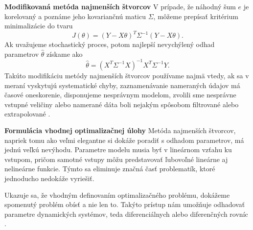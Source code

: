 \textbf{Modifikovaná metóda najmenších štvorcov}
\newline
V prípade, že náhodný šum $ e $ je korelovaný a poznáme jeho kovariančnú maticu $ \Sigma $, môžeme prepísať kritérium minimalizácie do tvaru 
\begin{equation}
	J\left(\theta\right) = \left(Y - X\theta \right)^T \Sigma^{-1} \left(Y - X\theta \right).
\end{equation}
Ak uvažujeme stochastický proces, potom najlepší nevychýlený odhad parametrov $ \hat{\theta} $ získame ako
\begin{equation}
	\hat{\theta} = \left(X^T \Sigma^{-1} X\right)^{-1}X^T \Sigma^{-1} Y.
\end{equation}
Takúto modifikáciu metódy najmenších štvorcov používame najmä vtedy, ak sa v meraní vyskytujú systematické chyby, zaznamenávanie nameraných údajov má časové oneskorenie, disponujeme nesprávnym modelom, zvolili sme nesprávne vstupné veličiny alebo namerané dáta boli nejakým spôsobom filtrované alebo extrapolované \cite{fikar:identifikacia:1999}.

\textbf{Formulácia vhodnej optimalizačnej úlohy}
\newline
Metóda najmenších štvorcov, napriek tomu ako veľmi elegantne si dokáže poradiť s odhadom parametrov, má jednú veľkú nevýhodu. Parametre modelu musia byť v lineárnom vzťahu ku vstupom, pričom samotné vstupy môžu predstavovať ľubovoľné lineárne aj nelineárne funkcie. Týmto sa eliminuje značná časť problematík, ktoré jednoducho nedokáže vyriešiť. 

Ukazuje sa, že vhodným definovaním optimalizačného problému, dokážeme spomenutý problém obísť a nie len to. Takýto prístup nám umožňuje odhadovať parametre dynamických systémov, teda diferenciálnych alebo diferenčných rovníc \cite{villaverde:opt_param_est:2018}.

